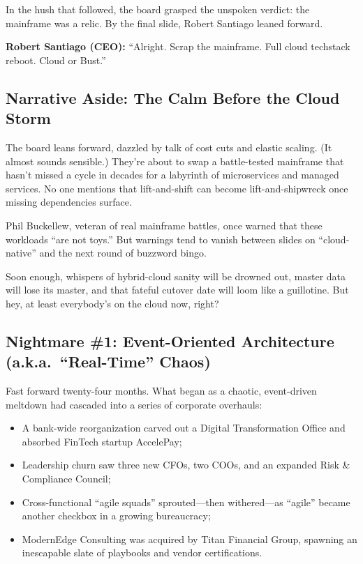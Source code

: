 In the hush that followed, the board grasped the unspoken verdict: the mainframe  
was a relic. By the final slide, Robert Santiago leaned forward.

\textbf{Robert Santiago (CEO):} “Alright. Scrap the mainframe. Full cloud techstack  
reboot. Cloud or Bust.”

\subsection{Narrative Aside: The Calm Before the Cloud Storm}

The board leans forward, dazzled by talk of cost cuts and elastic scaling.  
(It almost sounds sensible.) They’re about to swap a battle-tested mainframe  
that hasn’t missed a cycle in decades for a labyrinth of microservices and  
managed services. No one mentions that lift-and-shift can become  
lift-and-shipwreck once missing dependencies surface.

Phil Buckellew, veteran of real mainframe battles, once warned that these  
workloads “are not toys.” But warnings tend to vanish between slides on  
“cloud-native” and the next round of buzzword bingo.

Soon enough, whispers of hybrid-cloud sanity will be drowned out, master data  
will lose its master, and that fateful cutover date will loom like a guillotine.  
But hey, at least everybody’s on the cloud now, right?  

\subsection{Nightmare \#1: Event-Oriented Architecture (a.k.a.\ “Real-Time” Chaos)}

Fast forward twenty-four months. What began as a chaotic, event-driven meltdown  
had cascaded into a series of corporate overhauls:

\begin{itemize}
  \item A bank-wide reorganization carved out a Digital Transformation Office  
        and absorbed FinTech startup AccelePay;  
  \item Leadership churn saw three new CFOs, two COOs, and an expanded Risk  
        \& Compliance Council;  
  \item Cross-functional “agile squads” sprouted—then withered—as “agile”  
        became another checkbox in a growing bureaucracy;  
  \item ModernEdge Consulting was acquired by Titan Financial Group, spawning  
        an inescapable slate of playbooks and vendor certifications.  
\end{itemize}

